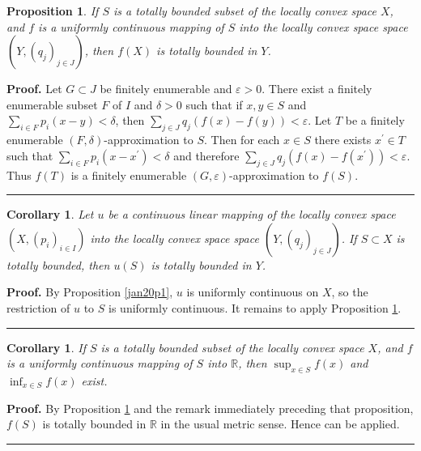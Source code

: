 \documentclass{article}%
\newtheorem{corollary}[theorem]{Corollary}
\newtheorem{proposition}[theorem]{Proposition}
\newenvironment{proof}[1][Proof]{\noindent\textbf{#1.} }{\ \rule{0.5em}{0.5em}}
\begin{document}
\begin{proposition}
\label{jan20p2}If $S$ is a totally bounded subset of the locally convex space
$X$, and $f$ is a uniformly continuous mapping of $S$ into the locally convex
space space $\left(  Y,\left(  q_{j}\right)  _{j\in J}\right)  $, then $f(X)$
is totally bounded in $Y$.
\end{proposition}

\begin{proof}
Let $G\subset J$ be finitely enumerable and $\varepsilon>0$. There exist a
finitely enumerable subset $F$ of $I$ and $\delta>0$ such that if $x,y\in S$
and $\sum_{i\in F}p_{i}(x-y)<\delta$, then $\sum_{j\in J}q_{j}%
(f(x)-f(y))<\varepsilon$. Let $T$ be a finitely enumerable $(F,\delta
)$-approximation to $S$. Then for each $x\in S$ there exists $x^{\prime}\in T$
such that $\sum_{i\in F}p_{i}(x-x^{\prime})<\delta$ and therefore $\sum_{j\in
J}q_{j}(f(x)-f(x^{\prime}))<\varepsilon$. Thus $f(T)$ is a finitely enumerable
$\left(  G,\varepsilon\right)  $-approximation to $f(S)$.
\end{proof}

\begin{corollary}
\label{jan22c1}Let $u$ be a continuous linear mapping of the locally convex
space $\left(  X,\left(  p_{i}\right)  _{i\in I}\right)  $ into the locally
convex space space $\left(  Y,\left(  q_{j}\right)  _{j\in J}\right)  $. If
$S\subset X$ is totally bounded, then $u(S)$ is totally bounded in $Y$.
\end{corollary}

\begin{proof}
By Proposition \ref{jan20p1}, $u$ is uniformly continuous on $X$, so the
restriction of $u$ to $S$ is uniformly continuous. It remains to apply
Proposition \ref{jan20p2}.
\end{proof}

\begin{corollary}
\label{jan20c2}If $S$ is a totally bounded subset of the locally convex space
$X$, and $f$ is a uniformly continuous mapping of $S$ into $\mathbb{R}$, then
$\sup_{x\in S}f(x)$ and $\inf_{x\in S}f(x)$ exist.
\end{corollary}

\begin{proof}
By Proposition \ref{jan20p2} and the remark immediately preceding that
proposition, $f(S)$ is totally bounded in $\mathbb{R}$ in the usual metric
sense. Hence \cite[Proposition 2.2.5]{BVtech} can be applied.
\end{proof}
\end{document}
